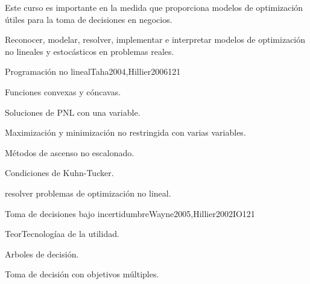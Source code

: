 \begin{syllabus}


\begin{justification}
Este curso es importante en la medida que proporciona modelos de optimización útiles para la toma de decisiones en negocios.
\end{justification}

\begin{goals}
\item Reconocer, modelar, resolver, implementar e interpretar modelos de optimización no lineales y estocásticos en problemas reales.
\end{goals}

\begin{outcomes}
\end{outcomes}

\begin{unit}{Programación no lineal}{Taha2004,Hillier2006}{12}{1}
   \begin{topics}
      \item Funciones convexas y cóncavas.
      \item Soluciones de PNL con una variable.
      \item Maximización y minimización no restringida con varias variables.
      \item Métodos de ascenso no escalonado.
      \item Condiciones de Kuhn-Tucker.
   \end{topics}

   \begin{unitgoals}
      \item resolver problemas de optimización no lineal.
   \end{unitgoals}
\end{unit}

\begin{unit}{Toma de decisiones bajo incertidumbre}{Wayne2005,Hillier2002IO}{12}{1}
   \begin{topics}
      \item TeorTecnologíaa de la utilidad.
      \item Arboles de decisión.
      \item Toma de decisión con objetivos múltiples.
   \end{topics}


\end{unit}
\end{syllabus}
